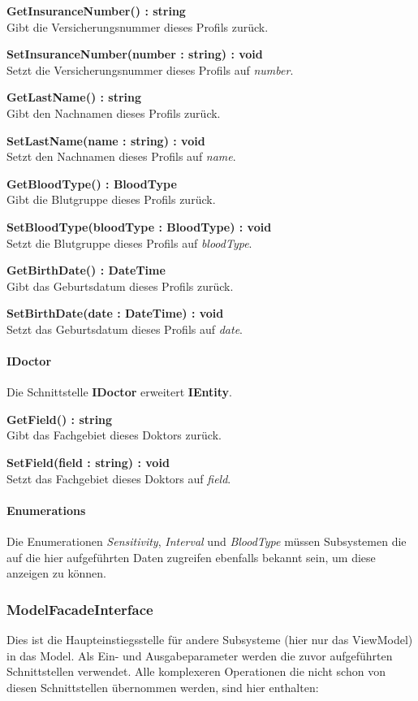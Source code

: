 \documentclass[a4paper]{scrreprt}
\begin{document}
\textbf{GetInsuranceNumber() : string}\\
Gibt die Versicherungsnummer dieses Profils zurück.

\textbf{SetInsuranceNumber(number : string) : void}\\
Setzt die Versicherungsnummer dieses Profils auf \textit{number}.

\textbf{GetLastName() : string}\\
Gibt den Nachnamen dieses Profils zurück.

\textbf{SetLastName(name : string) : void}\\
Setzt den Nachnamen dieses Profils auf \textit{name}.

\textbf{GetBloodType() : BloodType}\\
Gibt die Blutgruppe dieses Profils zurück.

\textbf{SetBloodType(bloodType : BloodType) : void}\\
Setzt die Blutgruppe dieses Profils auf \textit{bloodType}.

\textbf{GetBirthDate() : DateTime}\\
Gibt das Geburtsdatum dieses Profils zurück.

\textbf{SetBirthDate(date : DateTime) : void}\\
Setzt das Geburtsdatum dieses Profils auf \textit{date}.

\paragraph{IDoctor}
Die Schnittstelle \textbf{IDoctor} erweitert \textbf{IEntity}.

\textbf{GetField() : string}\\
Gibt das Fachgebiet dieses Doktors zurück.

\textbf{SetField(field : string) : void}\\
Setzt das Fachgebiet dieses Doktors auf \textit{field}.

\paragraph{Enumerations}
Die Enumerationen \textit{Sensitivity}, \textit{Interval} und \textit{BloodType} müssen Subsystemen die auf die hier aufgeführten Daten zugreifen ebenfalls bekannt sein, um diese anzeigen zu können.

\subsubsection{ModelFacadeInterface}
Dies ist die Haupteinstiegsstelle für andere Subsysteme (hier nur das ViewModel) in das Model. Als Ein- und Ausgabeparameter werden die zuvor aufgeführten Schnittstellen verwendet. Alle komplexeren Operationen die nicht schon von diesen Schnittstellen übernommen werden, sind hier enthalten:
\end{document}
